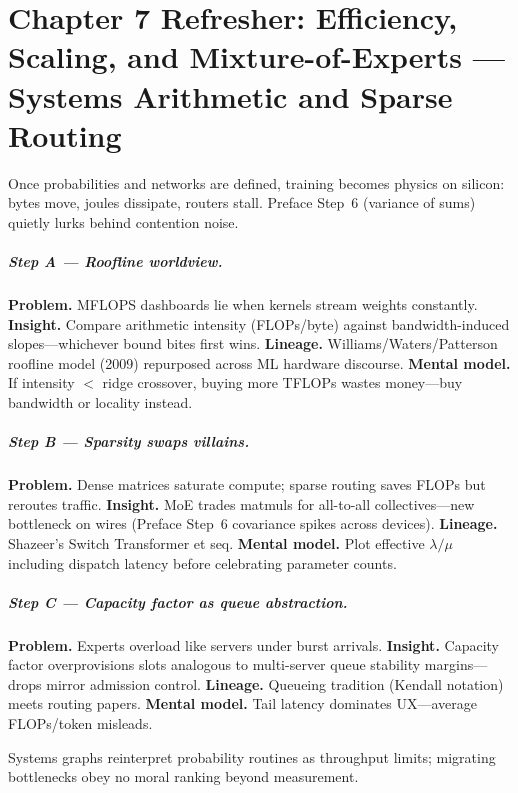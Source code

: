 \chapter{Chapter 7 Refresher: Efficiency, Scaling, and Mixture-of-Experts --- Systems Arithmetic and Sparse Routing}
\label{chap:efficiency}

\scenelabel
Once probabilities and networks are defined, training becomes physics on silicon: bytes move, joules dissipate, routers stall. Preface Step~6 (variance of sums) quietly lurks behind contention noise.

\paragraph{Step A --- Roofline worldview.}
\textbf{Problem.} MFLOPS dashboards lie when kernels stream weights constantly.
\textbf{Insight.} Compare arithmetic intensity (FLOPs/byte) against bandwidth-induced slopes---whichever bound bites first wins.
\textbf{Lineage.} Williams/Waters/Patterson roofline model (2009) repurposed across ML hardware discourse.
\textbf{Mental model.} If intensity $<$ ridge crossover, buying more TFLOPs wastes money---buy bandwidth or locality instead.

\paragraph{Step B --- Sparsity swaps villains.}
\textbf{Problem.} Dense matrices saturate compute; sparse routing saves FLOPs but reroutes traffic.
\textbf{Insight.} MoE trades matmuls for all-to-all collectives---new bottleneck on wires (Preface Step~6 covariance spikes across devices).
\textbf{Lineage.} Shazeer's Switch Transformer et seq.
\textbf{Mental model.} Plot effective \(\lambda/\mu\) including dispatch latency before celebrating parameter counts.

\paragraph{Step C --- Capacity factor as queue abstraction.}
\textbf{Problem.} Experts overload like servers under burst arrivals.
\textbf{Insight.} Capacity factor overprovisions slots analogous to multi-server queue stability margins---drops mirror admission control.
\textbf{Lineage.} Queueing tradition (Kendall notation) meets routing papers.
\textbf{Mental model.} Tail latency dominates UX---average FLOPs/token misleads.

Systems graphs reinterpret probability routines as throughput limits; migrating bottlenecks obey no moral ranking beyond measurement.

